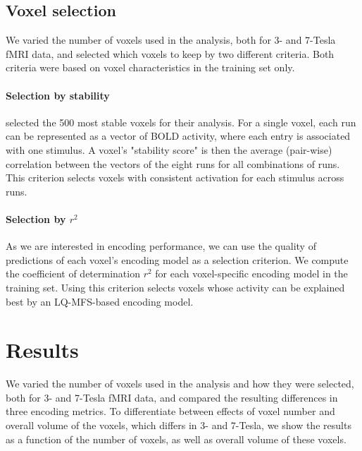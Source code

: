 \subsection*{Voxel selection}

We varied the number of voxels used in the analysis, both for 3- and 7-Tesla
f{MRI} data, and selected which voxels to keep by two different criteria. Both
criteria were based on voxel characteristics in the training set only.

\paragraph{Selection by stability}

\citet{ML08} selected the 500 most stable voxels for their analysis. For a
single voxel, each run can be represented as a vector of BOLD activity, where
each entry is associated with one stimulus. A voxel's "stability score" is then
the average (pair-wise) correlation between the vectors of the eight runs for
all combinations of runs.  This criterion selects voxels with consistent
activation for each stimulus across runs.

\paragraph{Selection by $r^2$}

As we are interested in encoding performance, we can use the quality of
predictions of each voxel's encoding model as a selection criterion. We compute
the coefficient of determination $r^2$ for each voxel-specific encoding model
in the training set. Using this criterion selects voxels whose activity can be
explained best by an LQ-MFS-based encoding model.

\section*{Results}

We varied the number of voxels used in the analysis and how they were selected,
both for 3- and 7-Tesla f{MRI} data, and compared the resulting differences in
three encoding metrics. To differentiate between effects of voxel number and
overall volume of the voxels, which differs in 3- and 7-Tesla, we show the
results as a function of the number of voxels, as well as overall volume of
these voxels.

